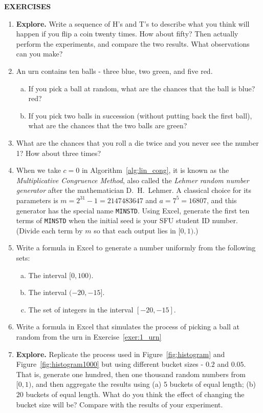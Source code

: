 \begin{center}
	\textbf{EXERCISES}
\end{center}

\begin{enumerate}[label={1.\arabic*},leftmargin=1cm]
	\item \textbf{Explore.} Write a sequence of H's and T's to describe what you think will happen if you flip a coin twenty times. How about fifty? Then actually perform the experiments, and compare the two results. What observations can you make?
	\item An urn contains ten balls - three blue, two green, and five red. \label{exer:1_urn}
		\begin{enumerate}[(a)]
			\item If you pick a ball at random, what are the chances that the ball is blue? red? 
			\item If you pick two balls in succession (without putting back the first ball), what are the chances that the two balls are green?
		\end{enumerate}
	\item What are the chances that you roll a die twice and you never see the number 1? How about three times?
	\item When we take $c = 0$ in Algorithm~\ref{alg:lin_cong}, it is known as the \emph{Multiplicative Congruence Method}, also called the \emph{Lehmer random number generator} after the mathematician D.~H.~Lehmer. A classical choice for its parameters is $m = 2^{31} - 1 = 2147483647$ and $a = 7^5 = 16807$, and this generator has the special name \texttt{MINSTD}. Using Excel, generate the first ten terms of \texttt{MINSTD} when the initial seed is your SFU student ID number. (Divide each term by $m$ so that each output lies in $[0,1)$.) \label{exer:1_Lehmer}
	\item Write a formula in Excel to generate a number uniformly from the following sets:
		\begin{enumerate}[(a)]
			\item The interval $[0, 100)$.
			\item The interval $(-20, -15]$.
			\item The set of integers in the interval $[-20,-15]$.
		\end{enumerate}
	\item Write a formula in Excel that simulates the process of picking a ball at random from the urn in Exercise~\ref{exer:1_urn}
	\item \textbf{Explore.} Replicate the process used in Figure~\ref{fig:histogram} and Figure~\ref{fig:histogram1000} but using different bucket sizes - $0.2$ and $0.05$. That is, generate one hundred, then one thousand random numbers from $[0,1)$, and then aggregate the results using (a) 5 buckets of equal length; (b) 20 buckets of equal length. What do you think the effect of changing the bucket size will be? Compare with the results of your experiment.

\end{enumerate}
